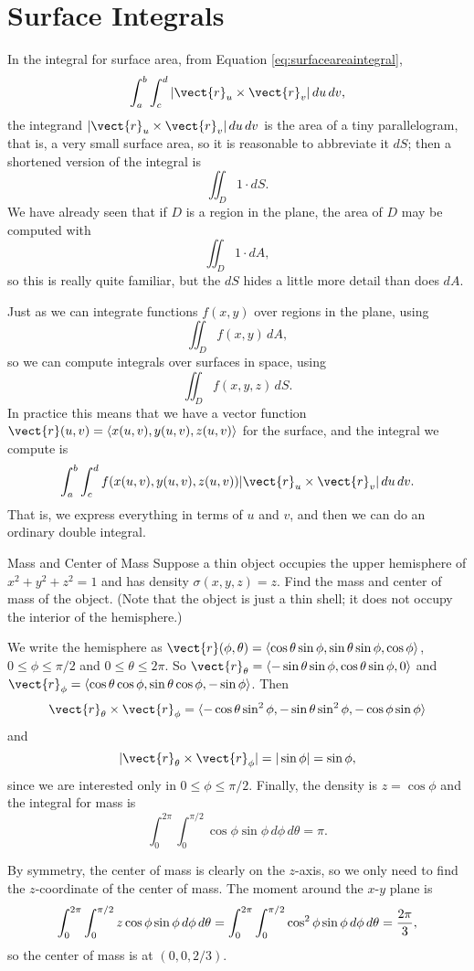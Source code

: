 \section{Surface Integrals}\label{sec:SurfaceIntegrals}

In the integral for surface area, from Equation \ref{eq:surfaceareaintegral},
$$\int_a^b\int_c^d |\vect{r}_u\times\vect{r}_v|\,du\,dv,$$
the integrand $|\vect{r}_u\times\vect{r}_v|\,du\,dv$
is the area of a tiny parallelogram, that is, a very small surface
area, so it is reasonable to abbreviate it $dS$; then a shortened
version of the integral is
$$\iint_{D} 1\cdot dS.$$
We have already seen that if $D$ is a region in the plane, the area of
$D$ may be computed with 
$$\iint_{D} 1\cdot dA,$$
so this is really quite familiar, but the $dS$ hides a little more
detail than does $dA$.

Just as we can integrate functions $f(x,y)$ over regions in the plane,
using
$$\iint_{D} f(x,y)\, dA,$$
so we can compute integrals over surfaces in space, using
$$\iint_{D} f(x,y,z)\, dS.$$
In practice this means that we have a vector function
$\vect{r}(u,v)=\langle x(u,v),y(u,v),z(u,v)\rangle$ for the surface,
and the integral we compute is
$$\int_a^b\int_c^d f(x(u,v),y(u,v),z(u,v))|\vect{r}_u\times\vect{r}_v|\,du\,dv.$$ 
That is, we express everything in terms of $u$ and $v$, and then we
can do an ordinary double integral.

\begin{example}{Mass and Center of Mass}{}
Suppose a thin object occupies the upper hemisphere of 
$x^2+y^2+z^2=1$ and has density $\sigma(x,y,z)=z$. Find the mass 
and center of mass of the
object. (Note that the object is just a thin shell; it does not occupy
the interior of the hemisphere.)
\end{example}
\begin{solution}
We write the hemisphere as $\vect{r}(\phi,\theta)=
\langle \cos\theta\sin\phi, \sin\theta\sin\phi, \cos\phi\rangle$,
$0\le\phi\le \pi/2$ and $0\le\theta\le 2\pi$. So
$\vect{r}_\theta = \langle -\sin\theta\sin\phi, \cos\theta\sin\phi, 0\rangle$
and 
$\vect{r}_\phi =\langle \cos\theta\cos\phi, \sin\theta\cos\phi, -\sin\phi\rangle$.
Then
$$\vect{r}_\theta\times\vect{r}_\phi =
\langle -\cos\theta\sin^2\phi,-\sin\theta\sin^2\phi,-\cos\phi\sin\phi\rangle$$
and
$$ |\vect{r}_\theta\times\vect{r}_\phi| = |\sin\phi| = \sin\phi,$$
since we are interested only in $0\le\phi\le \pi/2$.
Finally, the density is $z=\cos\phi$ and the integral for mass is
$$\int_0^{2\pi}\int_0^{\pi/2} \cos\phi\sin\phi\,d\phi\,d\theta=\pi.$$

By symmetry, the center of mass is clearly on the $z$-axis, so we only
need to find the $z$-coordinate of the center of mass. The moment
around the $x$-$y$ plane is
$$\int_0^{2\pi}\int_0^{\pi/2} z\cos\phi\sin\phi\,d\phi\,d\theta
=\int_0^{2\pi}\int_0^{\pi/2} \cos^2\phi\sin\phi\,d\phi\,d\theta
={2\pi\over 3},$$
so the center of mass is at $(0,0,2/3)$.
\end{solution}

